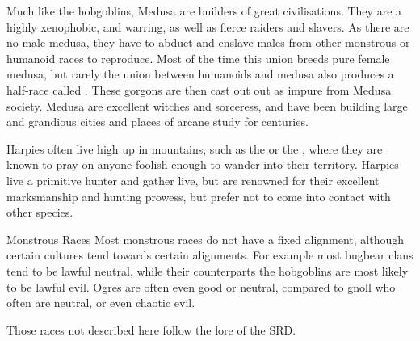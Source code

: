 Much like the hobgoblins, Medusa are builders of great civilisations. They are
a highly xenophobic, and warring, as well as fierce raiders and slavers. As
there are no male medusa, they have to abduct and enslave males from other
monstrous or humanoid races to reproduce. Most of the time this union breeds
pure female medusa, but rarely the union between humanoids and medusa also
produces a half-race called . These gorgons are then cast
out out as impure from Medusa society. Medusa are excellent witches and
sorceress, and have been building large and grandious cities and places of
arcane study for centuries.

Harpies often live high up in mountains, such as the 
or the , where they are known to pray on anyone
foolish enough to wander into their territory. Harpies live a primitive hunter
and gather live, but are renowned for their excellent marksmanship and hunting
prowess, but prefer not to come into contact with other species.

\begin{35e}{Monstrous Races}
  Most monstrous races do not have a fixed alignment, although certain
  cultures tend towards certain alignments. For example most bugbear clans
  tend to be lawful neutral, while their counterparts the hobgoblins are most
  likely to be lawful evil. Ogres are often even good or neutral, compared to
  gnoll who often are neutral, or even chaotic evil.

  Those races not described here follow the lore of the SRD.
\end{35e}
